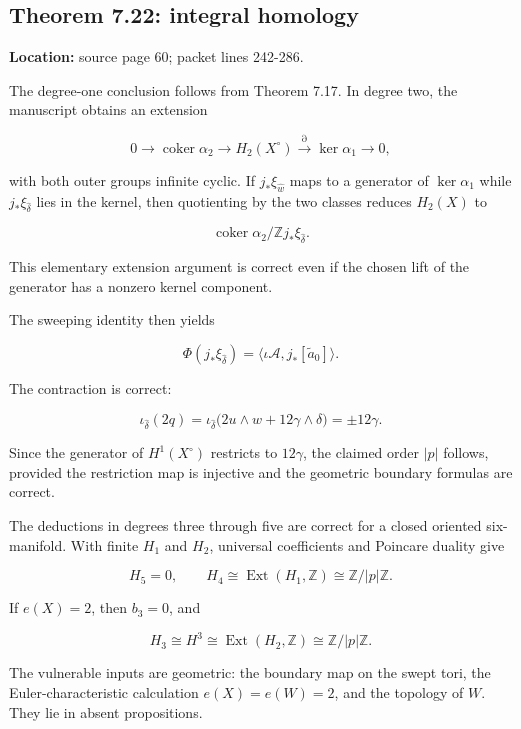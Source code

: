 \documentclass[
  10pt,
]{article}
\begin{document}
\subsection{Theorem 7.22: integral
homology}\label{theorem-7.22-integral-homology}

\textbf{Location:} source page 60; packet lines 242-286.

The degree-one conclusion follows from Theorem 7.17. In degree two, the
manuscript obtains an extension

\[
0\to\operatorname{coker}\alpha_2\to H_2(X^\circ)
 \xrightarrow{\partial}\ker\alpha_1\to0,
\]

with both outer groups infinite cyclic. If \(j_*\xi_{\widehat w}\) maps
to a generator of \(\ker\alpha_1\) while \(j_*\xi_{\widehat\delta}\)
lies in the kernel, then quotienting by the two classes reduces
\(H_2(X)\) to

\[
\operatorname{coker}\alpha_2/
\mathbb Zj_*\xi_{\widehat\delta}.
\]

This elementary extension argument is correct even if the chosen lift of
the generator has a nonzero kernel component.

The sweeping identity then yields

\[
\Phi(j_*\xi_{\widehat\delta})
 =\langle\iota\mathcal A,j_*[\widetilde a_0]\rangle.
\]

The contraction is correct:

\[
\iota_{\widehat\delta}(2q)
 =\iota_{\widehat\delta}\bigl(2u\wedge w+12\gamma\wedge\delta\bigr)
 =\pm12\gamma.
\]

Since the generator of \(H^1(X^\circ)\) restricts to \(12\gamma\), the
claimed order \(|p|\) follows, provided the restriction map is injective
and the geometric boundary formulas are correct.

The deductions in degrees three through five are correct for a closed
oriented six-manifold. With finite \(H_1\) and \(H_2\), universal
coefficients and Poincare duality give

\[
H_5=0,\qquad H_4\cong\operatorname{Ext}(H_1,\mathbb Z)
 \cong\mathbb Z/|p|\mathbb Z.
\]

If \(e(X)=2\), then \(b_3=0\), and

\[
H_3\cong H^3\cong\operatorname{Ext}(H_2,\mathbb Z)
 \cong\mathbb Z/|p|\mathbb Z.
\]

The vulnerable inputs are geometric: the boundary map on the swept tori,
the Euler-characteristic calculation \(e(X)=e(W)=2\), and the topology
of \(W\). They lie in absent propositions.
\end{document}

